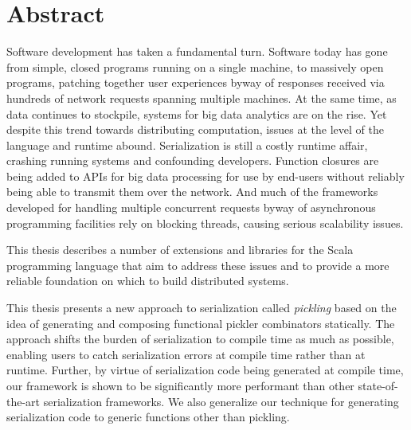 

\cleardoublepage
\chapter*{Abstract}


Software development has taken a fundamental turn. Software today has gone from
simple, closed programs running on a single machine, to massively open programs,
patching together user experiences byway of responses received via hundreds of
network requests spanning multiple machines. At the same time, as data continues
to stockpile, systems for big data analytics are on the rise. Yet despite this
trend towards distributing computation, issues at the level of the language and
runtime abound. Serialization is still a costly runtime affair, crashing running
systems and confounding developers. Function closures are being added to APIs
for big data processing for use by end-users without reliably being able to
transmit them over the network. And much of the frameworks developed for
handling multiple concurrent requests byway of asynchronous programming
facilities rely on blocking threads, causing serious scalability issues.

\vspace{0.2cm}

This thesis describes a number of extensions and libraries for the Scala
programming language that aim to address these issues and to provide a more
reliable foundation on which to build distributed systems.

\vspace{0.2cm}

This thesis presents a new approach to serialization called {\em pickling} based
on the idea of generating and composing functional pickler combinators
statically. The approach shifts the burden of serialization to compile time as
much as possible, enabling users to catch serialization errors at compile time
rather than at runtime. Further, by virtue of serialization code being generated
at compile time, our framework is shown to be significantly more performant than
other state-of-the-art serialization frameworks. We also generalize our
technique for generating serialization code to  generic functions other than pickling.

\vspace{0.2cm}

